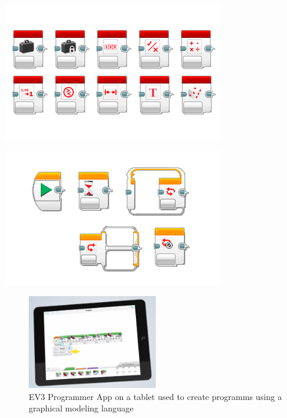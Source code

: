 \documentclass[runningheads,a4paper]{llncs}
\begin{document}
  \begin{minipage}{.5\textwidth} %
	  \centering
    \includegraphics[width=\textwidth]{images/LearnToProgram_operations_blocks_landscape.png}
  \end{minipage}
  \begin{minipage}{.5\textwidth} %
	  \centering
    \includegraphics[width=\textwidth]{images/LearnToProgram_flow_blocks_landscape.png}
    \label{ev3pbrick}
  \end{minipage}
  
  
    \begin{figure}[ht]
	  \centering
    \includegraphics[width=0.5\textwidth]{images/mindstorms0.PNG}
	  \caption{EV3 Programmer App on a tablet used to create programms using a graphical modeling language}
    \end{figure}
\end{document}
